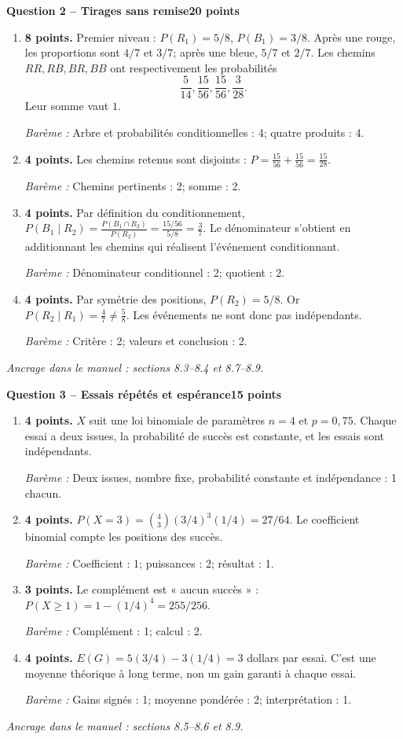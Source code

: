 \documentclass[11pt,a4paper]{article}
\begin{document}
\newpage
{\large\bfseries Question 2 -- Tirages sans remise}\hfill\textbf{20 points}\par
\begin{enumerate}
\item \textbf{8 points.} Premier niveau : \(P(R_1)=5/8\), \(P(B_1)=3/8\). Après une rouge, les proportions sont \(4/7\) et \(3/7\); après une bleue, \(5/7\) et \(2/7\). Les chemins \(RR,RB,BR,BB\) ont respectivement les probabilités \[\frac5{14},\frac{15}{56},\frac{15}{56},\frac3{28}.\] Leur somme vaut \(1\).
\par{\small\textit{Barème : }Arbre et probabilités conditionnelles : 4; quatre produits : 4.}
\item \textbf{4 points.} Les chemins retenus sont disjoints : \(P=\frac{15}{56}+\frac{15}{56}=\frac{15}{28}\).
\par{\small\textit{Barème : }Chemins pertinents : 2; somme : 2.}
\item \textbf{4 points.} Par définition du conditionnement, \(P(B_1\mid R_2)=\frac{P(B_1\cap R_2)}{P(R_2)}=\frac{15/56}{5/8}=\frac37\). Le dénominateur s’obtient en additionnant les chemins qui réalisent l’événement conditionnant.
\par{\small\textit{Barème : }Dénominateur conditionnel : 2; quotient : 2.}
\item \textbf{4 points.} Par symétrie des positions, \(P(R_2)=5/8\). Or \(P(R_2\mid R_1)=\frac47\ne\frac58\). Les événements ne sont donc pas indépendants.
\par{\small\textit{Barème : }Critère : 2; valeurs et conclusion : 2.}
\end{enumerate}
\vfill {\small\textit{Ancrage dans le manuel : sections 8.3--8.4 et 8.7--8.9.}}

\newpage
{\large\bfseries Question 3 -- Essais répétés et espérance}\hfill\textbf{15 points}\par
\begin{enumerate}
\item \textbf{4 points.} \(X\) suit une loi binomiale de paramètres \(n=4\) et \(p=0{,}75\). Chaque essai a deux issues, la probabilité de succès est constante, et les essais sont indépendants.
\par{\small\textit{Barème : }Deux issues, nombre fixe, probabilité constante et indépendance : 1 chacun.}
\item \textbf{4 points.} \(P(X=3)=\binom43(3/4)^3(1/4)=27/64\). Le coefficient binomial compte les positions des succès.
\par{\small\textit{Barème : }Coefficient : 1; puissances : 2; résultat : 1.}
\item \textbf{3 points.} Le complément est « aucun succès » : \(P(X\ge1)=1-(1/4)^4=255/256\).
\par{\small\textit{Barème : }Complément : 1; calcul : 2.}
\item \textbf{4 points.} \(E(G)=5(3/4)-3(1/4)=3\) dollars par essai. C’est une moyenne théorique à long terme, non un gain garanti à chaque essai.
\par{\small\textit{Barème : }Gains signés : 1; moyenne pondérée : 2; interprétation : 1.}
\end{enumerate}
\vfill {\small\textit{Ancrage dans le manuel : sections 8.5--8.6 et 8.9.}}
\end{document}
